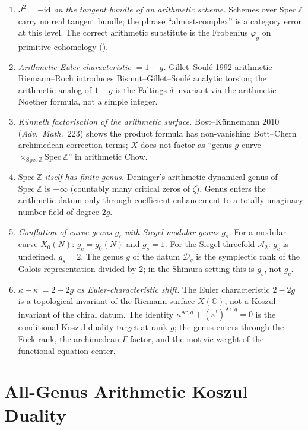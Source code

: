 \begin{enumerate}
\item \emph{\(J^2=-\mathrm{id}\) on the tangent bundle of an arithmetic
scheme.} Schemes over \(\mathrm{Spec}\,\mathbb{Z}\) carry no real tangent
bundle; the phrase ``almost-complex'' is a category error at this level.
The correct arithmetic substitute is the Frobenius \(\varphi_g\) on
primitive cohomology ().
\item \emph{Arithmetic Euler characteristic \(=1-g\).}
Gillet--Soul\'e 1992 arithmetic Riemann--Roch introduces
Bismut--Gillet--Soul\'e analytic torsion; the arithmetic analog of \(1-g\)
is the Faltings \(\delta\)-invariant via the arithmetic Noether formula,
not a simple integer.
\item \emph{K\"unneth factorisation of the arithmetic surface.}
Bost--K\"unnemann 2010 (\emph{Adv.~Math.}~223) shows the product formula
has non-vanishing Bott--Chern archimedean correction terms; \(X\) does
not factor as ``genus-\(g\) curve
\(\times_{\mathrm{Spec}\,\mathbb{Z}}\mathrm{Spec}\,\mathbb{Z}\)'' in
arithmetic Chow.
\item \emph{\(\overline{\mathrm{Spec}\,\mathbb{Z}}\) itself has finite genus.}
Deninger's arithmetic-dynamical genus of \(\mathrm{Spec}\,\mathbb{Z}\) is
\(+\infty\) (countably many critical zeros of \(\zeta\)). Genus enters the
arithmetic datum only through coefficient enhancement to a totally
imaginary number field of degree \(2g\).
\item \emph{Conflation of curve-genus \(g_c\) with Siegel-modular genus
\(g_s\).} For a modular curve \(X_0(N)\): \(g_c=g_0(N)\) and \(g_s=1\).
For the Siegel threefold \(\mathcal{A}_2\): \(g_c\) is undefined, \(g_s=2\).
The genus \(g\) of the datum \(\mathcal{D}_g\) is the symplectic rank of the
Galois representation divided by \(2\); in the Shimura setting this is
\(g_s\), not \(g_c\).
\item \emph{\(\kappa+\kappa^!=2-2g\) as Euler-characteristic shift.}
The Euler characteristic \(2-2g\) is a topological invariant of the
Riemann surface \(X(\mathbb{C})\), not a Koszul invariant of the chiral
datum. The identity \(\kappa^{\mathrm{Ar},g}+(\kappa^{!})^{\mathrm{Ar},g}=0\)
is the conditional Koszul-duality target at rank \(g\); the genus enters
through the Fock rank, the archimedean \(\Gamma\)-factor, and the
motivic weight of the functional-equation center.
\end{enumerate}

\section{All-Genus Arithmetic Koszul Duality}
\label{v4-arith:ag:load-bearing}

